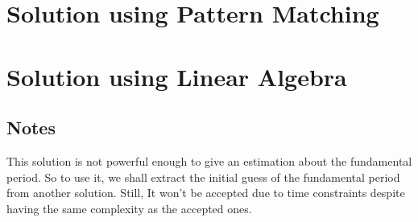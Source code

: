 \documentclass[]{article}
\begin{document}
\pagebreak
\section{Solution using Pattern Matching}

\pagebreak
\section{Solution using Linear Algebra}
\subsection{Notes}
This solution is not powerful enough to give an estimation about the fundamental period. So to use it, we shall extract the initial guess of the fundamental period from another solution.
\newline
Still, It won't be accepted due to time constraints despite having the same complexity as the accepted ones.
\end{document}
